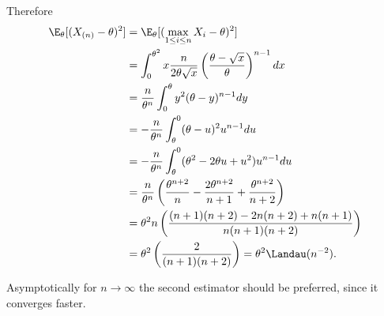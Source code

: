 \begin{solution}
\begin{enumerate}[label = (\alph*)]
  Therefore
  \begin{align*}
    \E_\theta[(X_{(n)} - \theta)^2] &= \E_\theta[(\max_{1 \leq i \leq n} X_i - \theta)^2] \\
    &= \int_0^{\theta^2} x\frac{n}{2\theta\sqrt{x}}
    \left(\frac{\theta - \sqrt{x}}{\theta}\right)^{n-1} dx \\
    &= \frac{n}{\theta^n}\int_0^{\theta} y^2(\theta - y)^{n-1} dy \\
    &= -\frac{n}{\theta^n}\int_\theta^{0} (\theta - u)^2u^{n-1} du \\
    &= -\frac{n}{\theta^n}\int_\theta^{0} 
    (\theta^2 - 2\theta u + u^2)u^{n-1} du \\
    &= \frac{n}{\theta^n}\left(\frac{\theta^{n+2}}{n} -
    \frac{2\theta^{n+2}}{n+1} + \frac{\theta^{n+2}}{n+2}\right) \\
    &= \theta^2n
    \left(\frac{(n+1)(n+2) - 2n(n+2) + n(n+1)}{n(n+1)(n+2)}\right) \\
    &= \theta^2\left(\frac{2}{(n+1)(n+2)}\right) = \theta^2 \Landau(n^{-2}).
  \end{align*}

  Asymptotically for $n \to \infty$ the second estimator should be preferred, since
  it converges faster.
\end{enumerate}

\end{solution}

